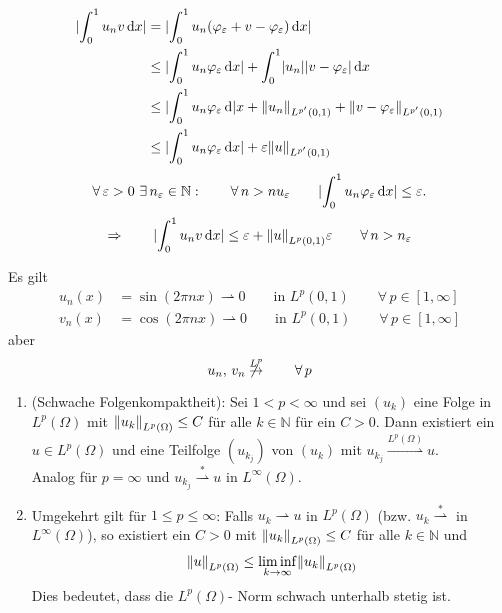 \begin{beweis}[Für $p >1$]
	\begin{align*}
		\abs{\int_{0}^{1} u_nv \,\mathrm{d}x} &= \abs{\int_{0}^{1} u_n (\varphi _{\varepsilon} + v - \varphi _{\varepsilon}) \,\mathrm{d}x} \\
		&\leq \abs{\int_{0}^{1} u_n \varphi _{\varepsilon} \,\mathrm{d}x} + \int_{0}^{1} \abs{u_n}\abs{v- \varphi _{\varepsilon}} \,\mathrm{d}x \\
		&\leq \abs{\int_{0}^{1} u_n \varphi _{\varepsilon} \,\mathrm{d}}x + \norm{u_n}_{L^{p'}(0,1)} + \norm{v - \varphi _{\varepsilon}}_{L^{p'}(0,1)} \\
		&\leq  \abs{ \int_{0}^{1} u_n \varphi _{\varepsilon} \,\mathrm{d}x} + \varepsilon \norm{u}_{L^{p'}(0,1)}
	\end{align*}
	\[
		\forall\, \varepsilon >0 \,\, \exists\, n _{\varepsilon} \in \mathbb{N}: \qquad \forall\, n>n u_{\varepsilon} \qquad \lvert \int_{0}^{1}u_n \varphi _{\varepsilon} \,\mathrm{d}x\rvert \leq \varepsilon.
	\]
	\[
		\Rightarrow \qquad  \abs{\int_{0}^{1}u_nv \,\mathrm{d}x} \leq \varepsilon + \norm{u}_{L^p(0,1)} \varepsilon \qquad \forall\, n> n_{\varepsilon}
	\]
\end{beweis}
\begin{beispiel}
	Es gilt 
	\begin{align*}
		u_n(x) &= \sin(2 \pi n x) \rightharpoonup 0 \qquad \text{in }L^p(0,1) \qquad \forall\, p \in [1,\infty] \\
		v_n(x) &= \cos(2 \pi n x) \rightharpoonup 0 \qquad \text{in }L^p(0,1) \qquad \forall\, p \in [1,\infty]
	\end{align*}
	aber 
	\[
		u_n, \,v_n \not \stackrel{L^p}{\to} \qquad \forall\, p
	\]
\end{beispiel}
\begin{satz}
	\begin{enumerate}[1)]
		\item (Schwache Folgenkompaktheit): Sei $1 < p < \infty$ und sei $(u_k)$ eine Folge in $L^p(\Omega)$ mit $\norm{u_k}_{L^p(\Omega)} \leq C$ für alle $k \in \mathbb{N}$ für ein $C>0$. Dann existiert ein $u \in L^p(\Omega)$ und eine Teilfolge $(u_{k_j})$ von $(u_k)$ mit $u_{k_j} \stackrel{L^p(\Omega)}{\rightharpoonup} u$. 
		\\Analog für $p = \infty$ und $u_{k_j} \stackrel{*}{\rightharpoonup} u$ in $L^{\infty}(\Omega)$.
		\item Umgekehrt gilt für $1 \leq p \leq \infty$: Falls $u_k \rightharpoonup u$ in $L^p(\Omega)$ (bzw. $u_k \stackrel{*}{\rightharpoonup}$ in $L^\infty(\Omega)$),
		so existiert ein $C>0$ mit $\norm{u_k}_{L^p(\Omega)} \leq C$ für alle $k \in \mathbb{N}$ und 
		\[
			\norm{u}_{L^p(\Omega)} \leq \liminf_{k \to \infty} \norm{u_k}_{L^p(\Omega)}
		\]
		Dies bedeutet, dass die $L^p(\Omega)$- Norm schwach unterhalb stetig ist.
	\end{enumerate}
\end{satz}
